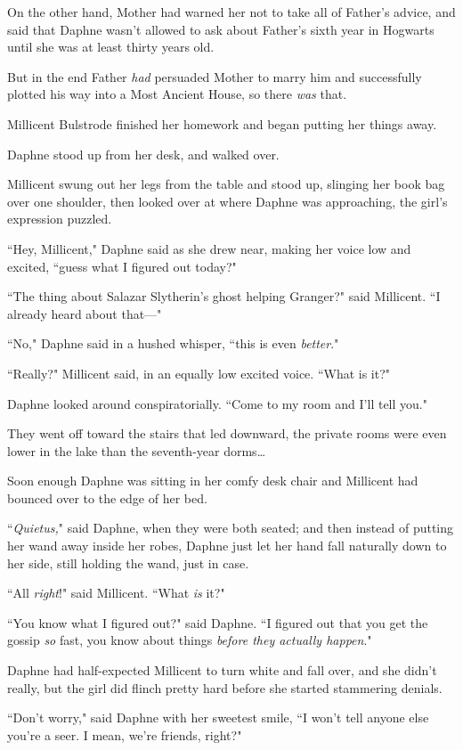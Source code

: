 On the other hand, Mother had warned her not to take all of Father's advice, and said that Daphne wasn't allowed to ask about Father's sixth year in Hogwarts until she was at least thirty years old.

But in the end Father \emph{had} persuaded Mother to marry him and successfully plotted his way into a Most Ancient House, so there \emph{was} that.

Millicent Bulstrode finished her homework and began putting her things away.

Daphne stood up from her desk, and walked over.

Millicent swung out her legs from the table and stood up, slinging her book bag over one shoulder, then looked over at where Daphne was approaching, the girl's expression puzzled.

``Hey, Millicent," Daphne said as she drew near, making her voice low and excited, ``guess what I figured out today?"

``The thing about Salazar Slytherin's ghost helping Granger?" said Millicent. ``I already heard about that—"

``No," Daphne said in a hushed whisper, ``this is even \emph{better}."

``Really?" Millicent said, in an equally low excited voice. ``What is it?"

Daphne looked around conspiratorially. ``Come to my room and I'll tell you."

They went off toward the stairs that led downward, the private rooms were even lower in the lake than the seventh-year dorms{\ldots}

Soon enough Daphne was sitting in her comfy desk chair and Millicent had bounced over to the edge of her bed.

``\emph{Quietus,}" said Daphne, when they were both seated; and then instead of putting her wand away inside her robes, Daphne just let her hand fall naturally down to her side, still holding the wand, just in case.

``All \emph{right}!" said Millicent. ``What \emph{is} it?"

``You know what I figured out?" said Daphne. ``I figured out that you get the gossip \emph{so} fast, you know about things \emph{before they actually happen}."

Daphne had half-expected Millicent to turn white and fall over, and she didn't really, but the girl did flinch pretty hard before she started stammering denials.

``Don't worry," said Daphne with her sweetest smile, ``I won't tell anyone else you're a seer. I mean, we're friends, right?"

